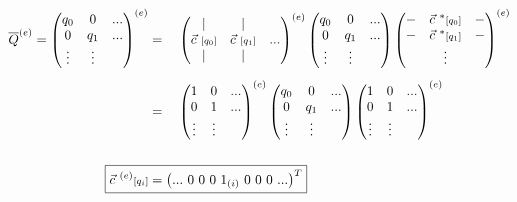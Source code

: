 \documentclass[12pt]{article}
\begin{document}
\vspace{15pt}
\indent \(\begin{aligned}
    \overline{Q}^{(e)} = 
        \left(\begin{matrix} 
            q_0     & 0         & ...\\
            0       & q_1       & ...\\
            \vdots  & \vdots    &
        \end{matrix}\right)^{(e)}
        &= \quad 
        \left(\begin{matrix} 
            |   & |   &    \\
            \vec{c}\ {\scriptstyle[q_0]} & \vec{c}\ {\scriptstyle[q_1]} & ... \\
            |   & |   & 
        \end{matrix}\right)^{(e)}
        \left(\begin{matrix} 
            q_0   & 0         & ...\\
            0           & q_1 & ...\\
            \vdots      & \vdots    & 
        \end{matrix}\right)
        \left(\begin{matrix} 
            - & \vec{c}^{\ *}{\scriptstyle[q_0]} & - \\
            - & \vec{c}^{\ *}{\scriptstyle[q_1]} & - \\
            & \vdots  &  \\
        \end{matrix}\right)^{(e)}\\[5pt]
    &= \quad 
        \left(\begin{matrix} 
            1       & 0     & ... \\
            0       & 1     & ... \\
            \vdots  & \vdots  &  \\
        \end{matrix}\right)^{(e)}
        \left(\begin{matrix} 
            q_0   & 0         & ...\\
            0           & q_1 & ...\\
            \vdots      & \vdots    &
        \end{matrix}\right)
        \left(\begin{matrix} 
            1       & 0     & ... \\
            0       & 1     & ... \\
            \vdots  & \vdots  &  \\
        \end{matrix}\right)^{(e)}\\[15pt]
    \Aboxed{ \vec{c}^{\ (e)}{\scriptstyle[q_i]} 
        &= \left( ...\ 0\ 0\ 0\ 1_{\scriptstyle(i)}\ 0\ 0\ 0\ ... \right)^T }
\end{aligned}\)
\end{document}
